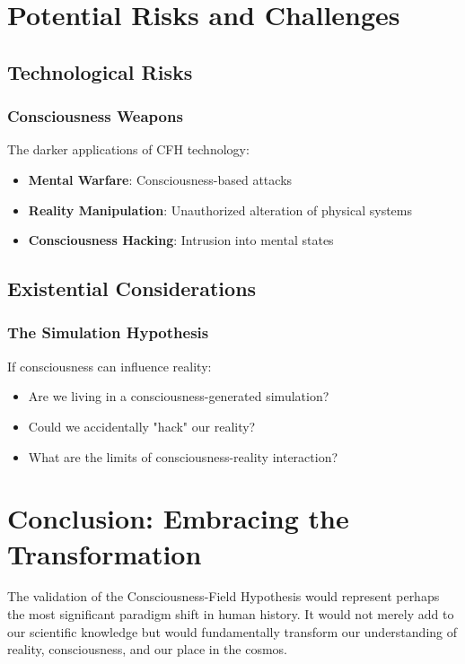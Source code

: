\documentclass[12pt,article]{memoir}
\begin{document}
\chapter{Potential Risks and Challenges}

\section{Technological Risks}

\subsection{Consciousness Weapons}

The darker applications of CFH technology:

\begin{itemize}
    \item \textbf{Mental Warfare}: Consciousness-based attacks
    \item \textbf{Reality Manipulation}: Unauthorized alteration of physical systems
    \item \textbf{Consciousness Hacking}: Intrusion into mental states
\end{itemize}

\section{Existential Considerations}

\subsection{The Simulation Hypothesis}

If consciousness can influence reality:
\begin{itemize}
    \item Are we living in a consciousness-generated simulation?
    \item Could we accidentally "hack" our reality?
    \item What are the limits of consciousness-reality interaction?
\end{itemize}

\chapter{Conclusion: Embracing the Transformation}

The validation of the Consciousness-Field Hypothesis would represent perhaps the most significant paradigm shift in human history. It would not merely add to our scientific knowledge but would fundamentally transform our understanding of reality, consciousness, and our place in the cosmos.
\end{document}
